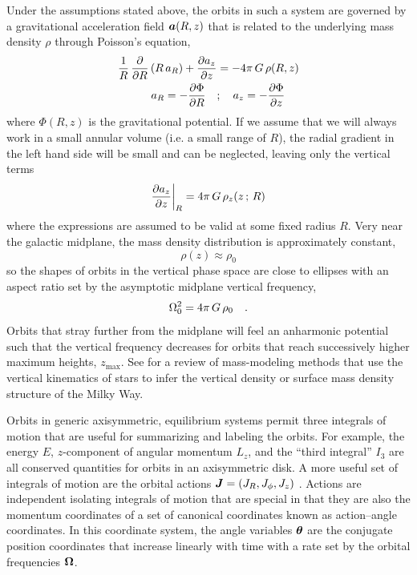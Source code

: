 Under the assumptions stated above, the orbits in such a system are governed by a
gravitational acceleration field $\boldsymbol{a}(R, z)$ that is related to the underlying mass
density $\rho$ through Poisson's equation,
\begin{align}
    \frac{1}{R} \, \frac{\partial {}}{\partial {R}}\left(R \, a_R\right) + \frac{\partial {a_z}}{\partial {z}}
        &= - 4\pi \, G \, \rho(R, z) \\
    a_R = -\frac{\partial {\Phi}}{\partial {R}} \quad &; \quad a_z = -\frac{\partial {\Phi}}{\partial {z}}
\end{align}
where $\Phi(R, z)$ is the gravitational potential.
If we assume that we will always work in a small annular volume (i.e. a small range of
$R$), the radial gradient in the left hand side will be small and can be neglected,
leaving only the vertical terms
\begin{equation}
    \frac{\partial {a_z}}{\partial {z}}\biggr\rvert_R = 4\pi \, G \, \rho_z(z \,;\, R)
\end{equation}
where the expressions are assumed to be valid at some fixed radius $R$.
Very near the galactic midplane, the mass density distribution is approximately
constant,
\begin{equation}
    \rho(z) \approx \rho_0
\end{equation}
so the shapes of orbits in the vertical phase space are close to ellipses with an aspect
ratio set by the asymptotic midplane vertical frequency,
\begin{equation}
    \Omega_0^2 = 4\pi\,G \, \rho_0 \quad . \label{eq:freqzero}
\end{equation}
Orbits that stray further from the midplane will feel an anharmonic potential such that
the vertical frequency decreases for orbits that reach successively higher maximum
heights, $z_{\textrm{max}}$.
See \citet{Read:2014} for a review of mass-modeling methods that use the vertical
kinematics of stars to infer the vertical density or surface mass density structure of
the Milky Way.

Orbits in generic axisymmetric, equilibrium systems permit three integrals of motion
that are useful for summarizing and labeling the orbits.
For example, the energy $E$, $z$-component of angular momentum $L_z$, and the ``third
integral'' $I_3$ are all conserved quantities for orbits in an axisymmetric disk.
A more useful set of integrals of motion are the orbital actions $\boldsymbol{J} = (J_R,
J_\phi, J_z)$ \citep{Binney:2008}.
Actions are independent isolating integrals of motion that are special in that they are
also the momentum coordinates of a set of canonical coordinates known as action--angle
coordinates.
In this coordinate system, the angle variables $\boldsymbol{\theta}$ are the conjugate position
coordinates that increase linearly with time with a rate set by the orbital frequencies
$\boldsymbol{\Omega}$.

